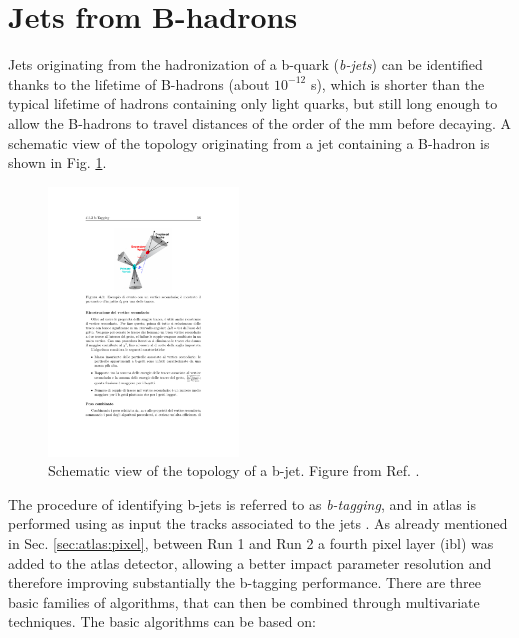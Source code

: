 \section{Jets from B-hadrons}

Jets originating from the hadronization of a b-quark (\textit{b-jets}) can be identified thanks to the lifetime of B-hadrons (about $10^{-12}$ s), which is shorter than the typical lifetime of hadrons containing only light quarks, but still long enough to allow the B-hadrons to travel distances of the order of the mm before decaying. A schematic view of the topology originating from a jet containing a B-hadron is shown in Fig. \ref{fig:btag}.


\begin{figure}[h]
\begin{center}
\includegraphics[width=0.45\textwidth]{./figures/objects/secvtx.pdf}
\end{center}
\caption[Schematic view of the topology of a b-jet.]{Schematic view of the topology of a b-jet. Figure from Ref. \cite{d0btagging}.}
\label{fig:btag}
\end{figure}

The procedure of identifying b-jets is referred to as \textit{b-tagging}, and in \gls{atlas} is performed using as input the tracks associated to the jets . As already mentioned in Sec. \ref{sec:atlas:pixel}, between Run 1 and Run 2 a fourth pixel layer (\gls{ibl}) was added to the \gls{atlas} detector, allowing a better impact parameter resolution and therefore improving substantially the b-tagging performance. There are three basic families of algorithms, that can then be combined through multivariate techniques. The basic algorithms can be based on:

